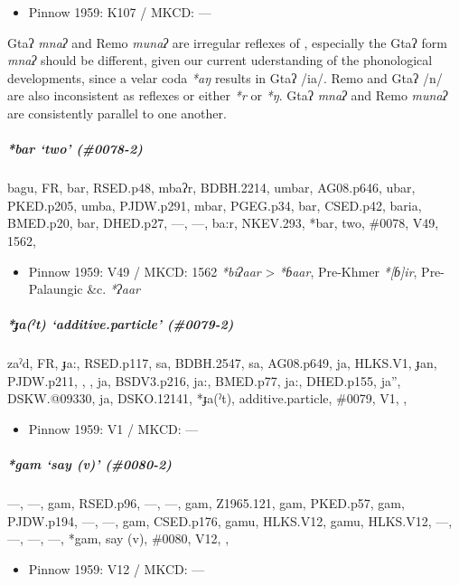 \documentclass[a4paper,]{article}
\providecommand{\tightlist}{%
  \setlength{\itemsep}{0pt}\setlength{\parskip}{0pt}}
\let\oldsubparagraph\subparagraph
\renewcommand{\subparagraph}[1]{\oldsubparagraph{#1}\mbox{}}
\begin{document}
\begin{itemize}
\tightlist
\item
  Pinnow 1959: K107 / MKCD: ---
\end{itemize}

Gtaʔ \emph{mnaʔ} and Remo \emph{munaʔ} are irregular reflexes of ,
especially the Gtaʔ form \emph{mnaʔ} should be different, given our
current uderstanding of the phonological developments, since a velar
coda \emph{*aŋ} results in Gtaʔ /ia/. Remo and Gtaʔ /n/ are also
inconsistent as reflexes or either \emph{*r} or \emph{*ŋ}. Gtaʔ
\emph{mnaʔ} and Remo \emph{munaʔ} are consistently parallel to one
another.

\subparagraph{\texorpdfstring{\emph{*bar} `two'
(\#0078-2)}{*bar two (\#0078-2)}}\label{bar-two-0078-2}

bagu, FR, bar, RSED.p48, mbaʔr, BDBH.2214, umbar, AG08.p646, ubar,
PKED.p205, umba, PJDW.p291, mbar, PGEG.p34, bar, CSED.p42, baria,
BMED.p20, bar, DHED.p27, ---, ---, ba:r, NKEV.293, *bar, two, \#0078,
V49, 1562,

\begin{itemize}
\tightlist
\item
  Pinnow 1959: V49 / MKCD: 1562 \emph{*biʔaar} \textgreater{}
  \emph{*ɓaar}, Pre-Khmer \emph{*{[}ɓ{]}ir}, Pre-Palaungic \&c.
  \emph{*ʔaar}
\end{itemize}

\subparagraph{\texorpdfstring{\emph{*ɟa(ˀt)} `additive.particle'
(\#0079-2)}{*ɟa(ˀt) additive.particle (\#0079-2)}}\label{ux25faux2c0t-additive.particle-0079-2}

zaˀd, FR, ɟa:, RSED.p117, sa, BDBH.2547, sa, AG08.p649, ja, HLKS.V1,
ɟan, PJDW.p211, , , ja, BSDV3.p216, ja:, BMED.p77, ja:, DHED.p155, ja'',
DSKW.@09330, ja, DSKO.12141, *ɟa(ˀt), additive.particle, \#0079, V1, ,

\begin{itemize}
\tightlist
\item
  Pinnow 1959: V1 / MKCD: ---
\end{itemize}

\subparagraph{\texorpdfstring{\emph{*gam} `say (v)'
(\#0080-2)}{*gam say (v) (\#0080-2)}}\label{gam-say-v-0080-2}

---, ---, gam, RSED.p96, ---, ---, gam, Z1965.121, gam, PKED.p57, gam,
PJDW.p194, ---, ---, gam, CSED.p176, gamu, HLKS.V12, gamu, HLKS.V12,
---, ---, ---, ---, *gam, say (v), \#0080, V12, ,

\begin{itemize}
\tightlist
\item
  Pinnow 1959: V12 / MKCD: ---
\end{itemize}
\end{document}
